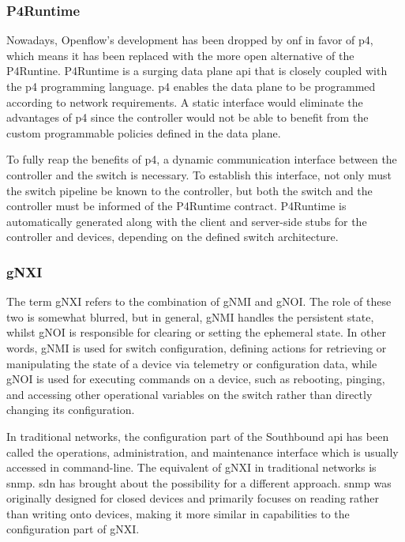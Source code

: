 \subsubsection{P4Runtime}
Nowadays, Openflow's development has been dropped by \gls{onf} in favor of \gls{p4}, which means it has been replaced with the more open alternative of the P4Runtine. P4Runtime is a surging data plane \gls{api}\cite{hauser_survey_2021} that is closely coupled with the \gls{p4} programming language. \gls{p4} enables the data plane to be programmed according to network requirements. A static interface would eliminate the advantages of \gls{p4} since the controller would not be able to benefit from the custom programmable policies defined in the data plane. 

To fully reap the benefits of \gls{p4}, a dynamic communication interface between the controller and the switch is necessary\cite{peterson_software-defined_2021}. To establish this interface, not only must the switch pipeline be known to the controller, but both the switch and the controller must be informed of the P4Runtime contract. P4Runtime is automatically generated along with the client and server-side stubs for the controller and devices, depending on the defined switch architecture\cite{peterson_software-defined_2021}.

\subsubsection{gNXI}
The term gNXI refers to the combination of gNMI and gNOI. The role of these two is somewhat blurred, but in general, gNMI handles the persistent state, whilst gNOI is responsible for clearing or setting the ephemeral state. In other words, gNMI is used for switch configuration, defining actions for retrieving or manipulating the state of a device via telemetry or configuration data, while gNOI is used for executing commands on a device, such as rebooting, pinging, and accessing other operational variables on the switch rather than directly changing its configuration\cite{peterson_software-defined_2021}\cite{noauthor_openconfig_nodate}.

In traditional networks, the configuration part of the Southbound api has been called the operations, administration, and maintenance interface which is usually accessed in command-line\cite{peterson_software-defined_2021}. The equivalent of gNXI in traditional networks is \gls{snmp}. \gls{sdn} has brought about the possibility for a different approach. \gls{snmp} was originally designed for closed devices and primarily focuses on reading rather than writing onto devices, making it more similar in capabilities to the configuration part of gNXI\cite{peterson_software-defined_2021}.

